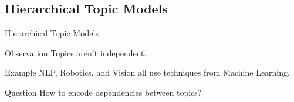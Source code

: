 \documentclass[10pt, svgnames]{beamer}
\begin{document}
\subsection{Hierarchical Topic Models}
\begin{frame}{Hierarchical Topic Models}
	\begin{block}{Observation}
		Topics aren't independent.
	\end{block}
	\begin{block}{Example}
		NLP, Robotics, and Vision all use
		techniques from Machine Learning.
	\end{block}
	\begin{block}{Question}
		How to encode dependencies between topics?
	\end{block}
\end{frame}
\end{document}
